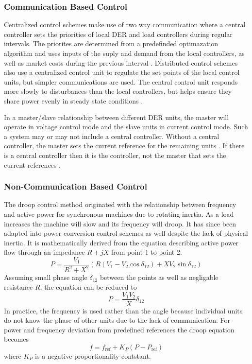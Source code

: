 \subsubsection{Communication Based Control}
Centralized control schemes make use of two way communication where a central controller sets the priorities of local DER and load controllers during regular intervals. The priorites are determined from a predefinded optimazation algorithm and uses inputs of the suply and demand from the local controllers, as well as market costs during the previous interval \cite{Katiraei2008}. Distributed control schemes also use a centralized control unit to regulate the set points of the local control units, but simpler communications are used. The central control unit responds more slowly to disturbances than the local controllers, but helps ensure they share power evenly in steady state conditions \cite{Prodanovic2006}. 

In a master/slave relationship between different DER units, the master will operate in voltage control mode and the slave units in current control mode. Such a system may or may not include a central controller. Without a central controller, the master sets the current reference for the remaining units \cite{Siri1992}. If there is a central controller then it is the controller, not the master that sets the current references \cite{Chen1995}.

\subsubsection{Non-Communication Based Control}
The droop control method originated with the relationship between frequency and active power for synchronous machines due to rotating inertia. As a load increases the machine will slow and its frequency will droop. It has since been adapted into power conversion control schemes as well despite the lack of physical inertia. It is mathematically derived from the equation describing active power flow through an impedance $ R + jX $ from point 1 to point 2.
\begin{equation}
P = \frac{V_{1}}{R^2 + X^2} \left( R \left( V_{1}-V_{2}\cos{\delta_{12}} \right) +X V_{2} \sin{\delta_{12}} \right)
\end{equation}
Assuming small phase angle $\delta_{12}$ between the points as well as negligable resistance $R$, the equation can be reduced to 
\begin{equation}
P = \frac{V_1V_2}{X}\delta_{12}
\end{equation}
In practice, the frequency is used rather than the angle because individual units do not know the phase of other units due to the lack of communication. For power and frequency deviation from predefined references the droop equation becomes
\begin{equation}
f = f_{\text{ref}} + K_P\left(P - P_{\text{ref}}\right)
\end{equation}
where $K_P$ is a negative proportionality contstant.

